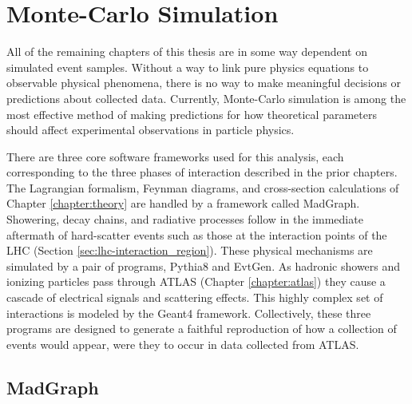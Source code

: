 \section{Monte-Carlo Simulation} \label{sec:mcsim}
    
    All of the remaining chapters of this thesis are in some way dependent on simulated event samples.
    Without a way to link pure physics equations to observable physical phenomena,
        there is no way to make meaningful decisions or predictions about collected data.
    Currently, Monte-Carlo simulation\cite{montecarlo} is among the most effective method of making predictions
        for how theoretical parameters should affect experimental observations in particle physics\cite{compphys}.

    There are three core software frameworks used for this analysis,
        each corresponding to the three phases of interaction described in the prior chapters.
    The Lagrangian formalism, Feynman diagrams, and cross-section calculations of Chapter \ref{chapter:theory}
        are handled by a framework called MadGraph\cite{madgraph}.
    Showering, decay chains, and radiative processes follow in the immediate aftermath of
        hard-scatter events such as those at the interaction points of the LHC (Section \ref{sec:lhc-interaction_region}).
    These physical mechanisms are simulated by a pair of programs, Pythia8\cite{pythia} and EvtGen\cite{EvtGen}.
    As hadronic showers and ionizing particles pass through ATLAS (Chapter \ref{chapter:atlas})
        they cause a cascade of electrical signals and scattering effects.
    This highly complex set of interactions is modeled by the Geant4 framework\cite{geant4}.
    Collectively, these three programs are designed to
        generate a faithful reproduction of how a collection of \vbfhhproc events would appear,
        were they to occur in data collected from ATLAS.


    \subsection{MadGraph}

